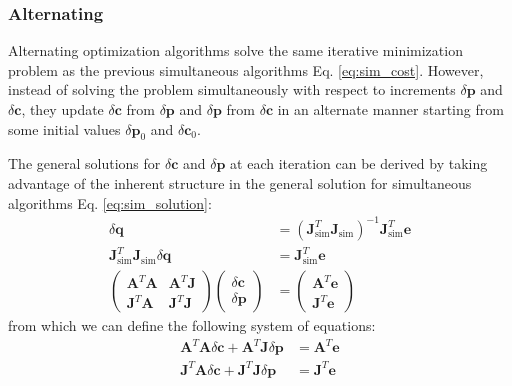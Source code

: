 \subsubsection{Alternating}
\label{sec:alternating}

Alternating optimization algorithms solve the same iterative minimization problem as the previous simultaneous algorithms Eq. \ref{eq:sim_cost}. However, instead of solving the problem simultaneously with respect to increments $\delta\mathbf{p}$ and $\delta\mathbf{c}$, they update $\delta\mathbf{c}$ from $\delta\mathbf{p}$ and $\delta\mathbf{p}$ from $\delta\mathbf{c}$ in an alternate manner starting from some initial values $\delta\mathbf{p}_0$ and $\delta\mathbf{c}_0$.

The general solutions for $\delta\mathbf{c}$ and $\delta\mathbf{p}$ at each iteration can be derived by taking advantage of the inherent structure in the general solution for simultaneous algorithms Eq. \ref{eq:sim_solution}:
\begin{equation}
    \begin{aligned}
        \delta\mathbf{q} & =  \left( \mathbf{J}_\text{sim}^T\mathbf{J}_\text{sim} \right)^{-1} \mathbf{J}_\text{sim}^T \mathbf{e}
        \\
        \mathbf{J}_\text{sim}^T\mathbf{J}_\text{sim} \delta\mathbf{q} & = \mathbf{J}_\text{sim}^T \mathbf{e} 
        \\
        \begin{pmatrix}
            \mathbf{A}^T\mathbf{A} & \mathbf{A}^T\mathbf{J} 
            \\ 
            \mathbf{J}^T\mathbf{A} & \mathbf{J}^T\mathbf{J} 
        \end{pmatrix}
        \begin{pmatrix}
            \delta\mathbf{c} 
            \\ 
            \delta\mathbf{p}
        \end{pmatrix}
        & = 
        \begin{pmatrix}
            \mathbf{A}^T\mathbf{e} 
            \\ 
            \mathbf{J}^T\mathbf{e} 
        \end{pmatrix}
    \label{eq:alt_structure}
    \end{aligned}
\end{equation}
from which we can define the following system of equations:
\begin{equation}
    \begin{aligned}
        \mathbf{A}^T\mathbf{A} \delta\mathbf{c} + \mathbf{A}^T\mathbf{J} \delta\mathbf{p} & = \mathbf{A}^T \mathbf{e} 
        \\
        \mathbf{J}^T\mathbf{A} \delta\mathbf{c} + \mathbf{J}^T\mathbf{J} \delta\mathbf{p} & = \mathbf{J}^T \mathbf{e}
    \label{eq:alt_system}
    \end{aligned}
\end{equation}
